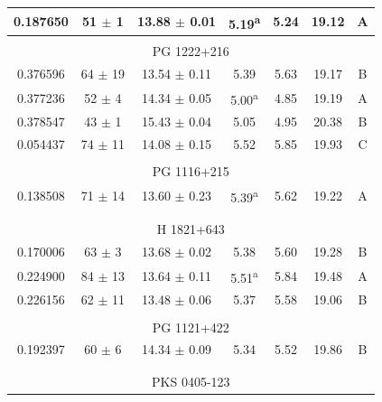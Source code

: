 \begin{longtable}{ccccccc}
            0.187650  &  51 $\pm$ 1  &  13.88 $\pm$ 0.01  &  5.19\textsuperscript{a}  &  5.24  &  19.12  &  A \\

            \hline \tabularnewline

            \multicolumn{7}{c}{PG 1222+216} \\ \hline 

            0.376596  &  64 $\pm$ 19  &  13.54 $\pm$ 0.11  &  5.39  &  5.63  &  19.17  &  B \\
            0.377236  &  52 $\pm$ 4  &  14.34 $\pm$ 0.05  &  5.00\textsuperscript{a}  &  4.85  &  19.19  &  A \\
            0.378547  &  43 $\pm$ 1  &  15.43 $\pm$ 0.04  &  5.05  &  4.95  &  20.38  &  B \\
            0.054437  &  74 $\pm$ 11  &  14.08 $\pm$ 0.15  &  5.52  &  5.85  &  19.93  &  C \\

            \hline \tabularnewline

            \multicolumn{7}{c}{PG 1116+215} \\ \hline 

            0.138508  &  71 $\pm$ 14  &  13.60 $\pm$ 0.23  &  5.39\textsuperscript{a}  &  5.62  &  19.22  &  A \\

            \hline \tabularnewline \tabularnewline 

            \multicolumn{7}{c}{H 1821+643} \\ \hline 

            0.170006  &  63 $\pm$ 3  &  13.68 $\pm$ 0.02  &  5.38  &  5.60  &  19.28  &  B \\
            0.224900  &  84 $\pm$ 13  &  13.64 $\pm$ 0.11  &  5.51\textsuperscript{a}  &  5.84  &  19.48  &  A \\
            0.226156  &  62 $\pm$ 11  &  13.48 $\pm$ 0.06  &  5.37  &  5.58  &  19.06  &  B \\

            \hline \tabularnewline

            \multicolumn{7}{c}{PG 1121+422} \\ \hline 

            0.192397  &  60 $\pm$ 6  &  14.34 $\pm$ 0.09  &  5.34  &  5.52  &  19.86  &  B \\

            \hline \tabularnewline \tabularnewline

            \multicolumn{7}{c}{PKS 0405-123} \\ \hline 


\end{longtable}
